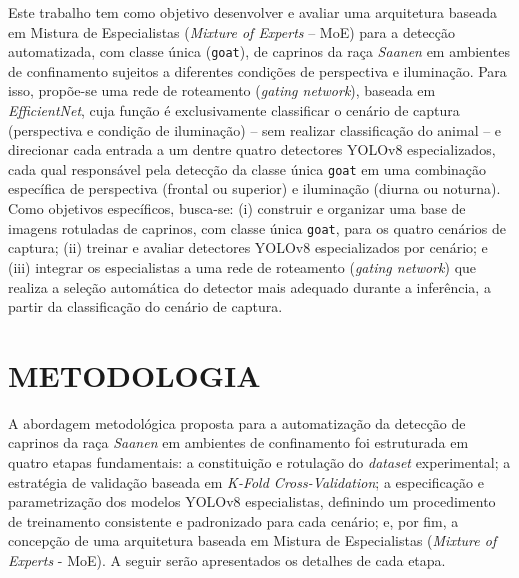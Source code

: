 \documentclass[12pt,fleqn]{article}
\begin{document}
Este trabalho tem como objetivo desenvolver e avaliar uma arquitetura baseada em Mistura de Especialistas (\textit{Mixture of Experts} -- MoE) para a detecção automatizada, com classe única (\texttt{goat}), de caprinos da raça \textit{Saanen} em ambientes de confinamento sujeitos a diferentes condições de perspectiva e iluminação. Para isso, propõe-se uma rede de roteamento (\textit{gating network}), baseada em \textit{EfficientNet}, cuja função é exclusivamente classificar o cenário de captura (perspectiva e condição de iluminação) -- sem realizar classificação do animal -- e direcionar cada entrada a um dentre quatro detectores YOLOv8 especializados, cada qual responsável pela detecção da classe única \texttt{goat} em uma combinação específica de perspectiva (frontal ou superior) e iluminação (diurna ou noturna). Como objetivos específicos, busca-se: (i) construir e organizar uma base de imagens rotuladas de caprinos, com classe única \texttt{goat}, para os quatro cenários de captura; (ii) treinar e avaliar detectores YOLOv8 especializados por cenário; e (iii) integrar os especialistas a uma rede de roteamento (\textit{gating network}) que realiza a seleção automática do detector mais adequado durante a inferência, a partir da classificação do cenário de captura.


\section{METODOLOGIA}

A abordagem metodológica proposta para a automatização da detecção de caprinos da raça \textit{Saanen} em ambientes de confinamento foi estruturada em quatro etapas fundamentais: a constituição e rotulação do \textit{dataset} experimental; a estratégia de validação baseada em \textit{K-Fold Cross-Validation}; a especificação e parametrização dos modelos YOLOv8 especialistas, definindo um procedimento de treinamento consistente e padronizado para cada cenário; e, por fim, a concepção de uma arquitetura baseada em Mistura de Especialistas (\textit{Mixture of Experts} - MoE). A seguir serão apresentados os detalhes de cada etapa.
\end{document}
